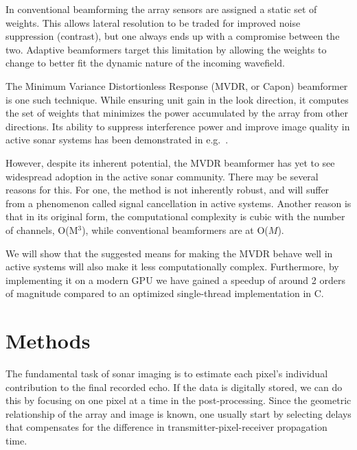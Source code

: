 \documentclass[12pt,journal,captionsoff,onecolumn]{IEEEtran}
\newcommand\1{\vec 1}
\begin{document}
In conventional beamforming the array sensors are assigned a static set of weights. This allows lateral resolution to be traded for improved noise suppression (contrast), but one always ends up with a compromise between the two. Adaptive beamformers target this limitation by allowing the weights to change to better fit the dynamic nature of the incoming wavefield.

The Minimum Variance Distortionless Response (MVDR, or Capon) beamformer is one such technique. While ensuring unit gain in the look direction, it computes the set of weights that minimizes the power accumulated by the array from other directions. Its ability to suppress interference power and improve image quality in active sonar systems has been demonstrated in e.g.~\cite{Blomberg2012a,Blomberg2011,Dursun2009,Lo2004}.

However, despite its inherent potential, the \gls{MVDR} beamformer has yet to see widespread adoption in the active sonar community. There may be several reasons for this. For one, the method is not inherently robust, and will suffer from a phenomenon called signal cancellation in active systems. Another reason is that in its original form, the computational complexity is cubic with the number of channels, O(M$^3$), while conventional beamformers are at O($M$).

We will show that the suggested means for making the \gls{MVDR} behave well in active systems will also make it less computationally complex. Furthermore, by implementing it on a modern \gls{GPU} we have gained a speedup of around 2 orders of magnitude compared to an optimized single-thread implementation in C.




\section{Methods}\label{methods}

The fundamental task of sonar imaging is to estimate each pixel's individual contribution to the final recorded echo. If the data is digitally stored, we can do this by focusing on one pixel at a time in the post-processing. Since the geometric relationship of the array and image is known, one usually start by selecting delays that compensates for the difference in transmitter-pixel-receiver propagation time.
\end{document}
